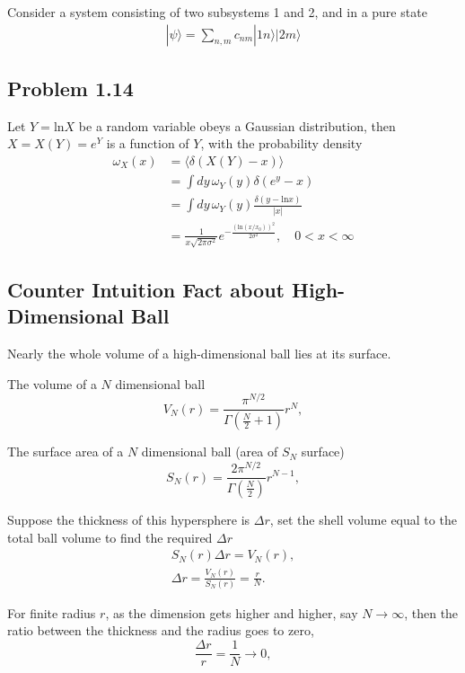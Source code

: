 \documentclass[10pt]{article}
\begin{document}
	Consider a system consisting of two subsystems 1 and 2, and in a pure state
	\begin{gather}
		|\psi\rangle = \sum_{n,m}c_{nm} |1n\rangle |2m\rangle
	\end{gather}


	\subsection{Problem 1.14}

	Let $Y = \mathrm{ln}X$ be a  random variable obeys a Gaussian distribution, then $X = X(Y) = e^{Y}$ is a function of $Y$, with the probability density
	\begin{align*}
		\omega_{X}(x) &= \langle \delta(X(Y) - x) \rangle \\
		&= \int dy \, \omega_Y(y) \delta(e^y - x) \\
		&= \int dy \, \omega_Y(y) \frac{\delta(y - \mathrm{ln}x)}{|x|} \\
		& = \frac{1}{x \sqrt{2\pi \sigma^2}} e^{-\frac{(\mathrm{ln}(x/x_0))^2}{2 \sigma^2}}, \quad 0<x<\infty
	\end{align*}


	\subsection{Counter Intuition Fact about High-Dimensional Ball}

	Nearly the whole volume of a high-dimensional ball lies at its surface.

	The volume of a $N$ dimensional ball
	\begin{equation}
		V_N(r) = \frac{\pi^{N/2}}{\Gamma(\frac{N}{2}+1)}r^N,
	\end{equation}

	The surface area of a $N$ dimensional ball (area of $S_N$ surface)
	\begin{equation}
		S_N(r) = \frac{2 \pi^{N/2}}{\Gamma(\frac{N}{2})}r^{N-1},
	\end{equation}

	Suppose the thickness of this hypersphere is $\Delta r$, set the shell volume equal to the total ball volume to find the required $\Delta r$
	\begin{align*}
		S_N(r) \Delta r = V_N(r), \\
		\Delta r = \frac{V_N(r)}{S_N(r)} = \frac{r}{N}.
	\end{align*}

	For finite radius $r$, as the dimension gets higher and higher, say $N \to \infty$, then the ratio between the thickness and the radius goes to zero,
	\begin{equation}
		\frac{\Delta r}{r} = \frac{1}{N} \to 0,
	\end{equation}
\end{document}
